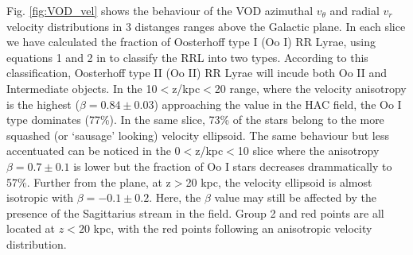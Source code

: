 \documentclass[fleqn,usenatbib]{mnras}
\begin{document}
Fig. \ref{fig:VOD_vel} shows the behaviour of the VOD azimuthal $v_{\theta}$ and radial $v_{r}$ velocity distributions in 3 distanges ranges above the Galactic plane. In each slice we have calculated the fraction of Oosterhoff type I (Oo I) RR Lyrae, using equations 1 and 2 in \citet{Be2018} to classify the RRL into two types. According to this classification, Oosterhoff type II (Oo II) RR Lyrae will incude both Oo II and Intermediate objects. In the 10$<$z/kpc$<$20 range, where the velocity anisotropy is the highest ($\beta = 0.84 \pm 0.03$) approaching the value in the HAC field, the Oo I type dominates  (77\%). In the same slice, 73\% of the stars belong to the more squashed (or `sausage' looking) velocity ellipsoid. The same behaviour but less accentuated can be noticed in the 0$<$z/kpc$<$10 slice where the anisotropy $\beta = 0.7 \pm 0.1$ is lower but the fraction of Oo I stars decreases drammatically to 57\%. Further from the plane, at  z$>$20 kpc, the velocity ellipsoid is almost isotropic with $\beta = -0.1 \pm 0.2$. Here, the $\beta$ value may still be affected by the presence of the Sagittarius stream in the field. Group 2 and red points are all located at $z<20$ kpc, with the red points following an anisotropic velocity distribution.
\end{document}
